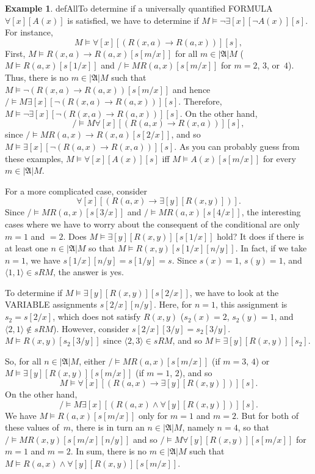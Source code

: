 \documentclass[10pt,a4paper]{article}
\newcommand*{\olup}[1]{\MakeUppercase{#1}}
\theoremstyle{plain}
\theoremstyle{definition}
\newtheorem{ex}[thm]{Example}
\theoremstyle{remark}
\providecommand{\lif}{\mathbin{\rightarrow}}
\providecommand{\lforall}{\mathord{\forall}}
\providecommand{\lexists}{\mathord{\exists}}
\providecommand{\Subst}[3]{#1[#2/#3]}
\providecommand{\Domain}{\ensuremath{|\mathfrak{A}|}}
\providecommand{\Assign}{\ensuremath{s}}
\providecommand{\Sat}[2]{\ensuremath{#1 \models #2}}
\providecommand{\tuple}[1]{\langle #1 \rangle}
\providecommand{\iftag}[1]{#1}
\providecommand{\iftag}{}
\begin{document}
\begin{ex}
\iftag{defAll}{To determine if a universally quantified
  \olup{formula}~$\lforall[x][A(x)]$ is satisfied, we have to determine
  if $\Sat{M}{\lnot\lexists[x][\lnot A(x)]}[s]$. For instance,
  \[
  \Sat{M}{\lforall[x][(R(x,a) \lif R(a,x))]}[s],
  \]
  First, $\Sat{M}{R(x,a) \lif R(a,x)}[\Subst{s}{m}{x}]$ for all $m \in
  \Domain M$ ($\Sat{M}{R(a,x)}[\Subst{s}{1}{x}]$ and
  $\Sat/{M}{R(a,x)}[\Subst{s}{m}{x}]$ for $m = 2$, $3$, or~$4$).
  Thus, there is no $m \in \Domain M$ such that
  $\Sat{M}{\lnot(R(x,a) \lif R(a,x))}[\Subst{s}{m}{x}]$ and hence
  $\Sat/{M}{\lexists[x][\lnot(R(x,a) \lif R(a,x))]}[s]$. Therefore,
  $\Sat{M}{\lnot\lexists[x][\lnot(R(x,a) \lif R(a,x))]}[s]$. On the
  other hand,
  \[
  \Sat/{M}{\lforall[x][(R(a,x) \lif R(x,a))]}[s],
  \]
  since $\Sat/{M}{R(a,x) \lif R(x,a)}[\Subst{s}{2}{x}]$, and so
  $\Sat{M}{\lexists[x][\lnot(R(a,x) \lif R(x,a))]}[s]$. As you can
  probably guess from these examples, $\Sat{M}{\lforall[x][A(x)]}[s]$
  iff $\Sat{M}{A(x)}[\Subst{s}{m}{x}]$ for every $m \in \Domain
  M$.}{}

For a more complicated case, consider
\[
\lforall[x][(R(a,x) \lif \lexists[y][R(x,y)])].
\]
Since $\Sat/{M}{R(a,x)}[\Subst{s}{3}{x}]$ and
$\Sat/{M}{R(a,x)}[\Subst{s}{4}{x}]$, the interesting cases where we
have to worry about the consequent of the conditional are only $m = 1$
and $ = 2$. Does $\Sat{M}{\lexists[y][R(x,y)]}[\Subst{s}{1}{x}]$
hold? It does if there is at least one $n \in \Domain M$ so that
$\Sat{M}{R(x,y)}[\Subst{\Subst{s}{1}{x}}{n}{y}]$. In fact, if we take
$n = 1$, we have $\Subst{\Subst{s}{1}{x}}{n}{y} = \Subst{s}{1}{y} =
s$. Since $s(x) = 1$, $s(y) = 1$, and $\tuple{1,1} \in \Assign{R}{M}$,
the answer is yes. 

To determine if $\Sat{M}{\lexists[y][R(x,y)]}[\Subst{s}{2}{x}]$, we
have to look at the \olup{variable} assignments
$\Subst{\Subst{s}{2}{x}}{n}{y}$. Here, for $n = 1$, this assignment
is~$s_2 = \Subst{s}{2}{x}$, which does not satisfy $R(x,y)$ ($s_2(x) =
2$, $s_2(y) = 1$, and $\tuple{2,1}\notin \Assign{R}{M}$). However,
consider $\Subst{\Subst{s}{2}{x}}{3}{y} = \Subst{s_2}{3}{y}$.
$\Sat{M}{R(x,y)}[\Subst{s_2}{3}{y}]$ since $\tuple{2,3} \in
\Assign{R}{M}$, and so $\Sat{M}{\lexists[y][R(x,y)]}[s_2]$.

So, for all $n \in \Domain M$, either
$\Sat/{M}{R(a,x)}[\Subst{s}{m}{x}]$ (if $m = 3$, $4$) or
$\Sat{M}{\lexists[y][R(x,y)]}[\Subst{s}{m}{x}]$ (if $m = 1$, $2$), and so
\[
\Sat{M}{\lforall[x][(R(a,x) \lif \lexists[y][R(x,y)])]}[s].
\]
On the other hand,
\[
\Sat/{M}{\lexists[x][(R(a,x) \land \lforall[y][R(x,y)])]}[s].
\]
We have $\Sat{M}{R(a,x)}[\Subst{s}{m}{x}]$ only for $m = 1$ and $m =
2$. But for both of these values of~$m$, there is in turn an $n \in
\Domain M$, namely $n = 4$, so that
$\Sat/{M}{R(x,y)}[\Subst{\Subst{s}{m}{x}}{n}{y}]$ and so
$\Sat/{M}{\lforall[y][R(x,y)]}[\Subst{s}{m}{x}]$ for $m = 1$ and $m =
2$. In sum, there is no $m \in \Domain M$ such that $\Sat{M}{R(a,x)
\land \lforall[y][R(x,y)]}[\Subst{s}{m}{x}]$.
\end{ex}
\end{document}
